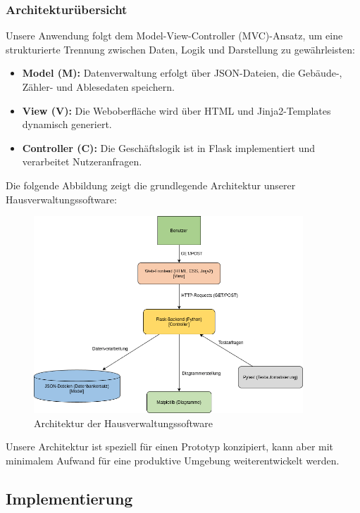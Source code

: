 \subsubsection{Architekturübersicht}

Unsere Anwendung folgt dem Model-View-Controller (MVC)-Ansatz, um eine strukturierte Trennung zwischen Daten, Logik und Darstellung zu gewährleisten:
\begin{itemize}
    \item \textbf{Model (M):} Datenverwaltung erfolgt über JSON-Dateien, die Gebäude-, Zähler- und Ablesedaten speichern.
    \item \textbf{View (V):} Die Weboberfläche wird über HTML und Jinja2-Templates dynamisch generiert.
    \item \textbf{Controller (C):} Die Geschäftslogik ist in Flask implementiert und verarbeitet Nutzeranfragen.
\end{itemize}

Die folgende Abbildung zeigt die grundlegende Architektur unserer Hausverwaltungssoftware:

\begin{figure}[H] \centering \includegraphics[width=0.9\textwidth]{src/abbildungen/architektur.png} %
    \caption{Architektur der Hausverwaltungssoftware} \label{fig:architektur} 
\end{figure}

Unsere Architektur ist speziell für einen Prototyp konzipiert, kann aber mit minimalem Aufwand für eine produktive Umgebung weiterentwickelt werden.

\subsection{Implementierung}\label{subsec:implementierung}

